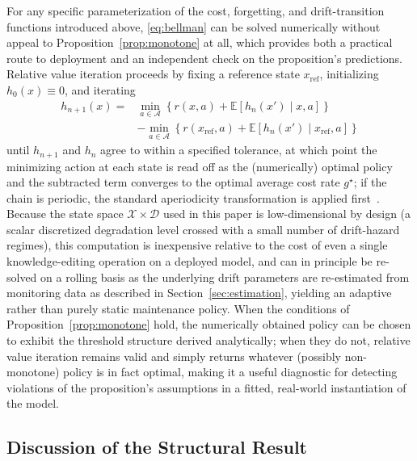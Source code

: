 \documentclass[electronics,article,submit,pdftex,moreauthors]{Definitions/mdpi}
\newcommand{\E}{\mathbb{E}}
\newcommand{\calA}{\mathcal{A}}
\newcommand{\calX}{\mathcal{X}}
\newcommand{\calD}{\mathcal{D}}
\begin{document}
For any specific parameterization of the cost, forgetting, and drift-transition functions introduced above, \eqref{eq:bellman} can be solved numerically without appeal to Proposition~\ref{prop:monotone} at all, which provides both a practical route to deployment and an independent check on the proposition's predictions. Relative value iteration proceeds by fixing a reference state $x_{\mathrm{ref}}$, initializing $h_0(x)\equiv 0$, and iterating
\begin{equation}\label{eq:rvi}
\begin{aligned}
h_{n+1}(x)={}&\min_{a\in\calA}\left\{r(x,a)+\E\left[h_n(x')\mid x,a\right]\right\}\\
&-\min_{a\in\calA}\left\{r(x_{\mathrm{ref}},a)+\E\left[h_n(x')\mid x_{\mathrm{ref}},a\right]\right\}
\end{aligned}
\end{equation}
until $h_{n+1}$ and $h_n$ agree to within a specified tolerance, at which point the minimizing action at each state is read off as the (numerically) optimal policy and the subtracted term converges to the optimal average cost rate $g^\star$; if the chain is periodic, the standard aperiodicity transformation is applied first~\cite{Puterman1994}. Because the state space $\calX\times\calD$ used in this paper is low-dimensional by design (a scalar discretized degradation level crossed with a small number of drift-hazard regimes), this computation is inexpensive relative to the cost of even a single knowledge-editing operation on a deployed model, and can in principle be re-solved on a rolling basis as the underlying drift parameters are re-estimated from monitoring data as described in Section~\ref{sec:estimation}, yielding an adaptive rather than purely static maintenance policy. When the conditions of Proposition~\ref{prop:monotone} hold, the numerically obtained policy can be chosen to exhibit the threshold structure derived analytically; when they do not, relative value iteration remains valid and simply returns whatever (possibly non-monotone) policy is in fact optimal, making it a useful diagnostic for detecting violations of the proposition's assumptions in a fitted, real-world instantiation of the model.

\subsection{Discussion of the Structural Result}\label{sec:structdiscussion}
\end{document}
